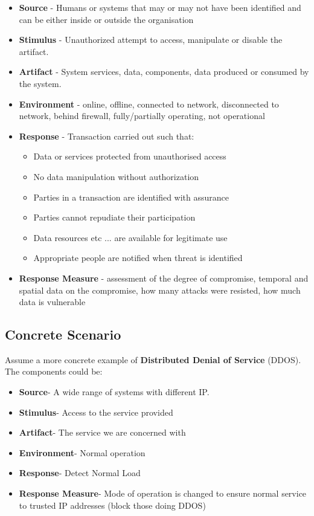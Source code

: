 \documentclass[a4paper]{article}
\begin{document}
\begin{itemize}
\item \textbf{Source} - Humans or systems that may or may not have been identified and can be either inside or outside the organisation
\item \textbf{Stimulus} - Unauthorized attempt to access, manipulate or disable the artifact.
\item \textbf{Artifact} - System services, data, components, data produced or consumed by the system.
\item \textbf{Environment} - online, offline, connected to network, disconnected to network, behind firewall, fully/partially operating, not operational
\item \textbf{Response} - Transaction carried out such that: 
\begin{itemize}
\item Data or services protected from unauthorised access
\item No data manipulation without authorization
\item Parties in a transaction are identified with assurance
\item Parties cannot repudiate their participation
\item Data resources etc ... are available for legitimate use
\item Appropriate people are notified when threat is identified
\end{itemize}
\item \textbf{Response Measure} - assessment of the degree of compromise, temporal and spatial data on the compromise, how many attacks were resisted, how much data is vulnerable
\end{itemize}

\subsection{Concrete Scenario}
Assume a more concrete example of \textbf{Distributed Denial of Service} (DDOS). The components could be:
\begin{itemize}
\item \textbf{Source}- A wide range of systems with different IP.
\item \textbf{Stimulus}- Access to the service provided
\item \textbf{Artifact}- The service we are concerned with
\item \textbf{Environment}- Normal operation
\item \textbf{Response}- Detect Normal Load
\item \textbf{Response Measure}- Mode of operation is changed to ensure normal service to trusted IP addresses (block those doing DDOS)
\end{itemize}
\end{document}
